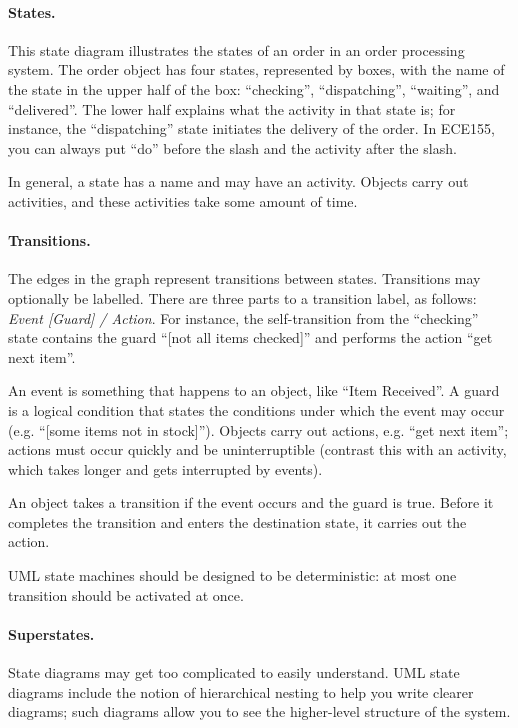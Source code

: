 \paragraph{States.} This state diagram illustrates the states of an order 
in an order processing system.  The order object has four states,
represented by boxes, with the name of the state in the upper half of
the box: ``checking'', ``dispatching'', ``waiting'', and ``delivered''.
The lower half explains what the activity in that state is; for
instance, the ``dispatching'' state initiates the delivery of the
order. In ECE155, you can always put ``do'' before the slash
and the activity after the slash.

In general, a state has a name and may have an activity. Objects
carry out activities, and these activities take some amount of time.

\paragraph{Transitions.} 
The edges in the graph represent transitions between states.
Transitions may optionally be labelled. There are three parts
to a transition label, as follows: \emph{Event [Guard] / Action}.
For instance, the self-transition from the ``checking'' state
contains the guard ``[not all items checked]'' and performs
the action ``get next item''. 

An event is something that happens to an object, like ``Item
Received''.  A guard is a logical condition that states the conditions
under which the event may occur (e.g. ``[some items not in stock]'').
Objects carry out actions, e.g. ``get next
item''; actions must occur quickly and be uninterruptible (contrast
this with an activity, which takes longer and gets interrupted by
events).

An object takes a transition if the event occurs and the guard is true.
Before it completes the transition and enters the destination state, it
carries out the action.

UML state machines should be designed to be deterministic: at most one
transition should be activated at once.

\paragraph{Superstates.} State diagrams may get too complicated
to easily understand. UML state diagrams include the notion of
hierarchical nesting to help you write clearer diagrams; such diagrams
allow you to see the higher-level structure of the system.

